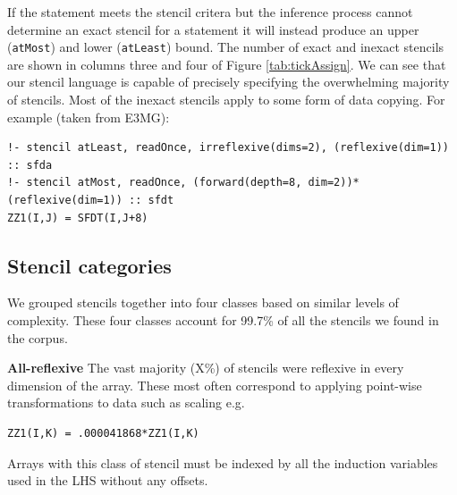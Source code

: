 \documentclass[9pt]{sigplanconf}
\theoremstyle{definition}
\newcommand{\term}[1]{\texttt{#1}}
\begin{document}





If the statement meets the stencil critera but the inference process cannot determine an exact stencil for a statement it will instead produce an upper (\term{atMost}) and lower (\term{atLeast}) bound. The number of exact and inexact stencils are shown in columns three and four of Figure \ref{tab:tickAssign}. We can see that our stencil language is capable of precisely specifying the overwhelming majority of stencils. Most of the inexact stencils apply to some form of data copying. For example (taken from E3MG):
\begin{verbatim}
!- stencil atLeast, readOnce, irreflexive(dims=2), (reflexive(dim=1)) :: sfda
!- stencil atMost, readOnce, (forward(depth=8, dim=2))*(reflexive(dim=1)) :: sfdt
ZZ1(I,J) = SFDT(I,J+8)
\end{verbatim}

\subsection{Stencil categories}


We grouped stencils together into four classes based on similar levels of complexity. These four classes account for 99.7\% of all the stencils we found in the corpus.

\textbf{All-reflexive} The vast majority (X\%) of stencils were
reflexive in every dimension of the array. These most often correspond
to applying point-wise transformations to data such as scaling
e.g. \begin{verbatim}
ZZ1(I,K) = .000041868*ZZ1(I,K)
\end{verbatim}
Arrays with this class of stencil must be indexed by all the induction
variables used in the LHS without any offsets.
\end{document}
